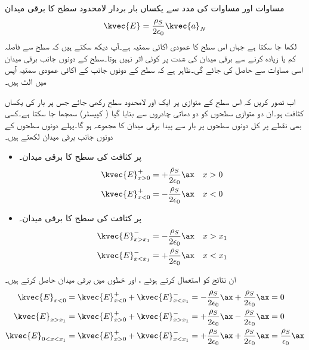 مساوات  اور مساوات  کی مدد سے یکساں بار بردار لامحدود سطح کا برقی میدان
\begin{align}\label{مساوات_کولمب_لامحدود_سطح_کی_برقی-میدان}
\kvec{E}=\frac{\rho_S}{2 \epsilon_0}\kvec{a}_N
\end{align}
لکھا جا سکتا ہے جہاں  اس سطح کا عمودی اکائی سمتیہ ہے۔آپ دیکھ سکتے ہیں کہ سطح سے فاصلہ کم یا زیادہ کرنے سے برقی میدان کی شدت پر کوئی اثر نہیں ہوتا۔سطح کے دونوں جانب برقی میدان اسی مساوات سے حاصل کی جائے گی۔ظاہر ہے کہ سطح کے دونوں جانب کے اکائی عمودی سمتیہ آپس میں الٹ ہیں۔

اب تصور کریں کہ اس سطح کے متوازی  پر  ایک اور لامحدود سطح  رکھی جائے جس پر بار کی یکساں کثافت  ہو۔ان دو متوازی سطحوں کو دو دھاتی چادروں سے بنایا گیا  ( کپیسٹر) سمجھا جا سکتا ہے۔کسی بھی نقطے پر کل  دونوں سطحوں پر بار سے پیدا برقی میدان کا مجموعہ ہو گا۔پہلے دونوں سطحوں کے دونوں جانب برقی میدان لکھتے ہیں۔ 
\begin{itemize}
\item
{} پر  کثافت کی سطح کا برقی میدان۔
\begin{align*}
\kvec{E}_{x>0}^{+}&=+\frac{\rho_S}{2\epsilon_0} \ax &x>0\\
\kvec{E}_{x<0}^{+}&=-\frac{\rho_S}{2\epsilon_0} \ax &x<0
\end{align*} 
\item
{} پر  کثافت کی سطح کا برقی میدان۔
\begin{align*}
\kvec{E}_{x>x_1}^{-}&=-\frac{\rho_S}{2\epsilon_0} \ax &x>x_1\\
\kvec{E}_{x<x_1}^{-}&=+\frac{\rho_S}{2\epsilon_0} \ax &x<x_1
\end{align*} 

\end{itemize}
ان نتائج کو استعمال کرتے ہوئے ، اور  خطوں میں برقی میدان حاصل کرتے ہیں۔
\begin{gather}
\begin{aligned}
\kvec{E}_{x<0}&=\kvec{E}_{x<0}^{+} +\kvec{E}_{x<x_1}^-=-\frac{\rho_S}{2\epsilon_0} \ax+\frac{\rho_S}{2\epsilon_0} \ax =0\\
\kvec{E}_{x>x_1}&=\kvec{E}_{x>0}^{+} +\kvec{E}_{x>x_1}^{-}=+\frac{\rho_S}{2\epsilon_0} \ax-\frac{\rho_S}{2\epsilon_0} \ax=0\\
\kvec{E}_{0<x<x_1}&=\kvec{E}_{x>0}^{+}+\kvec{E}_{x<x_1}^{-}=+\frac{\rho_S}{2\epsilon_0} \ax+\frac{\rho_S}{2\epsilon_0} \ax =\frac{\rho_S}{\epsilon_0} \ax
\end{aligned}
\end{gather}


